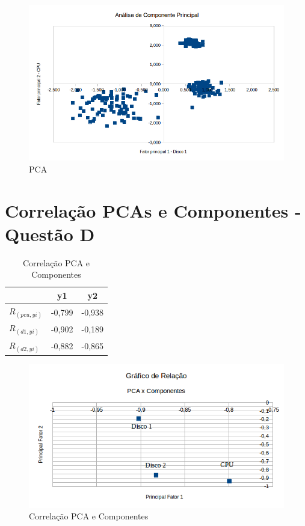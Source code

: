 \documentclass[11pt,a4paper,openany,oneside]{abntex2}
\begin{document}
	\begin{figure}[H]
		\centering%
		\includegraphics[scale=0.60]{pca.png}
		\caption{PCA }
		\label{fig:pca}
	\end{figure}


\chapter{Correlação PCAs e Componentes - Questão D}
\label{qd}

\begin{table}[H]
	\caption{Correlação PCA e Componentes}
	\centering
	\begin{tabular}{|l|c|c|}
		\hline
		\textbf{}     & \textbf{y1} & \textbf{y2} \\ \hline
		$R_{(pcu,yi)}$ & -0,799       & -0,938 \\ \hline
		$R_{(d1,yi)}$  & -0,902       & -0,189 \\ \hline
		$R_{(d2,yi)}$  & -0,882       & -0,865 \\ \hline
	\end{tabular}
	\label{tab:pcaconponentes}
\end{table}

	\begin{figure}[H]
		\centering%
		\includegraphics[scale=0.80]{relacao.png}
		\caption{Correlação PCA e Componentes}
		\label{fig:pcacomp}
	\end{figure}
\end{document}
